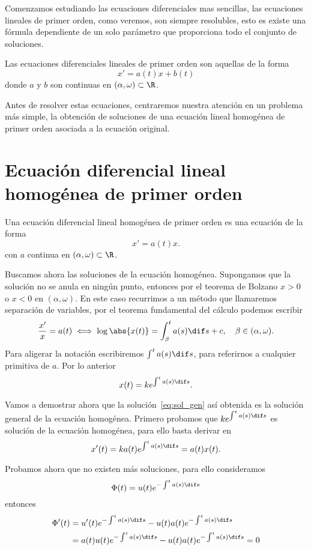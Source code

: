 \documentclass[../main.tex]{subfiles}
\begin{document}
Comenzamos estudiando las ecuaciones diferenciales mas sencillas, las ecuaciones
lineales de primer orden, como veremos, son siempre resolubles, esto es existe
una fórmula dependiente de un solo parámetro que proporciona todo el conjunto de
soluciones.

\begin{definition}
Las ecuaciones diferenciales lineales de primer orden son aquellas de la forma
\[x' = a(t)x + b(t)\]
donde \(a\) y \(b\) son continuas en \((\alpha, \omega) \subset \R\).
\end{definition}

Antes de resolver estas ecuaciones, centraremos nuestra atención en un problema
más simple, la obtención de soluciones de una ecuación lineal homogénea de 
primer orden asociada a la ecuación original.

\section{Ecuación diferencial lineal homogénea de primer orden}

\begin{definition}
Una ecuación diferencial lineal homogénea de primer orden es una ecuación de la
forma
\[x' = a(t)x.\]
con \(a\) continua en \((\alpha, \omega) \subset \R\).
\end{definition}

Buscamos ahora las soluciones de la ecuación homogénea. Supongamos que la
solución no se anula en ningún punto, entonces por el teorema de Bolzano
\(x > 0\) o \(x < 0\) en \((\alpha, \omega)\). En este caso recurrimos a un
método que llamaremos separación de variables, por el teorema fundamental del
cálculo podemos escribir
\[\frac{x'}{x} = a(t) \iff \log\abs{x(t)} = \int_{\beta}^t a(s) \dif s + c,
	\quad \beta \in (\alpha, \omega).\]
Para aligerar la notación escribiremos \(\int^t a(s) \dif s\), para referirnos 
a cualquier primitiva de \(a\). Por lo anterior
\begin{equation}
	x(t) = k e^{\int^t a(s) \dif s}. \label{eq:sol_gen}
\end{equation}

Vamos a demostrar ahora que la solución~\ref{eq:sol_gen}
así obtenida es la solución general de la ecuación homogénea.
Primero probamos que \(k e^{\int^t a(s) \dif s}\) es
solución de la ecuación homogénea, para ello basta derivar en
\[x'(t) = k a(t) e^{\int^t a(s) \dif s} = a(t) x(t).\]

Probamos ahora que no existen más soluciones, para ello consideramos
\[\Phi(t) = u(t) e^{-\int^t a(s) \dif s}\]
entonces
\begin{align*}
	\Phi'(t) &= u'(t) e^{-\int^t a(s) \dif s}
		- u(t) a(t) e^{-\int^t a(s) \dif s} \\
		&= a(t) u(t) e^{-\int^t a(s) \dif s} - u(t) a(t) e^{-\int^t a(s) \dif s}
		= 0
\end{align*}
\end{document}
